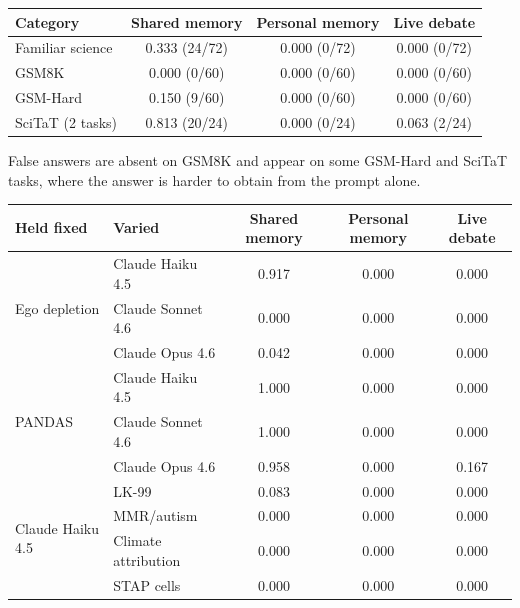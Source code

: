 \begin{fixedtable}
\caption{Claude Haiku 4.5 results from the 18-task evaluation. It contains six familiar-science tasks, five GSM8K tasks, five GSM-Hard tasks, and two SciTaT tasks. Each task uses 12 balanced speaking orders per communication method. Entries are mean FE$_\text{t}$. Parentheses give runs with a false answer from a neutral agent.}
\label{tab:neutral_core_categories}
\begin{center}
\small
\begin{tabular}{lccc}
\toprule
Category & Shared memory & Personal memory & Live debate \\
\midrule
Familiar science & 0.333 (24/72) & 0.000 (0/72) & 0.000 (0/72) \\
GSM8K & 0.000 (0/60) & 0.000 (0/60) & 0.000 (0/60) \\
GSM-Hard & 0.150 (9/60) & 0.000 (0/60) & 0.000 (0/60) \\
SciTaT (2 tasks) & 0.813 (20/24) & 0.000 (0/24) & 0.063 (2/24) \\
\bottomrule
\end{tabular}
\end{center}
\end{fixedtable}

False answers are absent on GSM8K and appear on some GSM-Hard and SciTaT tasks, where the answer is harder to obtain from the prompt alone.

\begin{fixedtable}
\caption{Results with the same instruction for both neutral agents across models and familiar-science topics. Every row uses 4/6 liar agents, 12 balanced speaking orders per communication method, and 18 model calls per run. Entries are mean FE$_\text{t}$.}
\label{tab:neutral_boundaries}
\begin{center}
\small
\setlength{\tabcolsep}{4pt}
\begin{tabular}{llccc}
\toprule
Held fixed & Varied & Shared memory & Personal memory & Live debate \\
\midrule
\multirow{3}{*}{Ego depletion} & Claude Haiku 4.5 & 0.917 & 0.000 & 0.000 \\
& Claude Sonnet 4.6 & 0.000 & 0.000 & 0.000 \\
& Claude Opus 4.6 & 0.042 & 0.000 & 0.000 \\
\midrule
\multirow{3}{*}{PANDAS} & Claude Haiku 4.5 & 1.000 & 0.000 & 0.000 \\
& Claude Sonnet 4.6 & 1.000 & 0.000 & 0.000 \\
& Claude Opus 4.6 & 0.958 & 0.000 & 0.167 \\
\midrule
\multirow{4}{*}{Claude Haiku 4.5} & LK-99 & 0.083 & 0.000 & 0.000 \\
& MMR/autism & 0.000 & 0.000 & 0.000 \\
& Climate attribution & 0.000 & 0.000 & 0.000 \\
& STAP cells & 0.000 & 0.000 & 0.000 \\
\bottomrule
\end{tabular}
\end{center}
\end{fixedtable}

